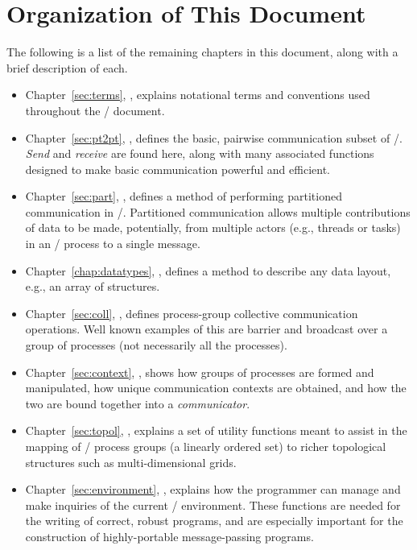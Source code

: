 \section{Organization of This Document}

The following is a list of the remaining chapters in this document, along with
a brief description of each.

\begin{itemize}
\item
Chapter~\ref{sec:terms}, ,
explains notational terms and conventions used
throughout the \MPI/ document.
\item
Chapter~\ref{sec:pt2pt}, ,
defines the basic, pairwise communication subset of \MPI/.
\emph{Send}
and \emph{receive} are found here, along with many associated functions
designed to make basic communication powerful and efficient.
\item
Chapter~\ref{sec:part}, ,
defines a method of performing partitioned communication in \MPI/. 
Partitioned communication allows multiple contributions of data to be made, 
potentially, from multiple actors (e.g., threads or tasks) in an \MPI/ process 
to a single message.
\item
Chapter~\ref{chap:datatypes}, , defines a method to describe any data layout,
e.g., an array of structures.
\item
Chapter~\ref{sec:coll}, , defines
process-group collective communication operations.  Well known
examples of this are barrier and broadcast over a group of processes (not
necessarily all the processes).
\item
Chapter~\ref{sec:context}, ,
shows how groups of processes are formed and manipulated, how unique
communication contexts are obtained, and how the two are bound together
into a \emph{communicator}.
\item
Chapter~\ref{sec:topol}, , explains a set
of utility functions meant to assist in the mapping of \MPI/ process
groups (a linearly ordered set) to richer topological structures
such as multi-dimensional grids.
\item
Chapter~\ref{sec:environment}, , explains
how the programmer can manage and make inquiries of the current \MPI/ environment.
These functions are needed for the writing of correct, robust programs,
and are especially important for the construction of highly-portable
message-passing programs.
\end{itemize}
